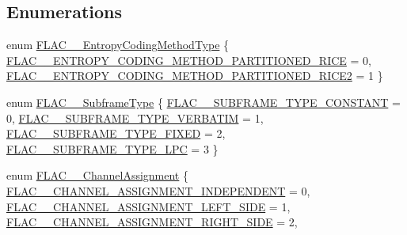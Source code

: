 \subsection*{Enumerations}
\begin{DoxyCompactItemize}
\item 
enum \mbox{\hyperlink{group__flac__format_ga951733d2ea01943514290012cd622d3a}{F\+L\+A\+C\+\_\+\+\_\+\+Entropy\+Coding\+Method\+Type}} \{ \mbox{\hyperlink{group__flac__format_gga951733d2ea01943514290012cd622d3aa5253f8b8edc61220739f229a299775dd}{F\+L\+A\+C\+\_\+\+\_\+\+E\+N\+T\+R\+O\+P\+Y\+\_\+\+C\+O\+D\+I\+N\+G\+\_\+\+M\+E\+T\+H\+O\+D\+\_\+\+P\+A\+R\+T\+I\+T\+I\+O\+N\+E\+D\+\_\+\+R\+I\+CE}} = 0, 
\mbox{\hyperlink{group__flac__format_gga951733d2ea01943514290012cd622d3aa202960a608ee91f9f11c2575b9ecc5aa}{F\+L\+A\+C\+\_\+\+\_\+\+E\+N\+T\+R\+O\+P\+Y\+\_\+\+C\+O\+D\+I\+N\+G\+\_\+\+M\+E\+T\+H\+O\+D\+\_\+\+P\+A\+R\+T\+I\+T\+I\+O\+N\+E\+D\+\_\+\+R\+I\+C\+E2}} = 1
 \}
\item 
enum \mbox{\hyperlink{group__flac__format_ga1f431eaf213e74d7747589932d263348}{F\+L\+A\+C\+\_\+\+\_\+\+Subframe\+Type}} \{ \mbox{\hyperlink{group__flac__format_gga1f431eaf213e74d7747589932d263348a9bf56d836aeffb11d614e29ea1cdf2a9}{F\+L\+A\+C\+\_\+\+\_\+\+S\+U\+B\+F\+R\+A\+M\+E\+\_\+\+T\+Y\+P\+E\+\_\+\+C\+O\+N\+S\+T\+A\+NT}} = 0, 
\mbox{\hyperlink{group__flac__format_gga1f431eaf213e74d7747589932d263348a8520596ef07d6c8577f07025f137657b}{F\+L\+A\+C\+\_\+\+\_\+\+S\+U\+B\+F\+R\+A\+M\+E\+\_\+\+T\+Y\+P\+E\+\_\+\+V\+E\+R\+B\+A\+T\+IM}} = 1, 
\mbox{\hyperlink{group__flac__format_gga1f431eaf213e74d7747589932d263348a6b3cce73039a513f9afefdc8e4f664a5}{F\+L\+A\+C\+\_\+\+\_\+\+S\+U\+B\+F\+R\+A\+M\+E\+\_\+\+T\+Y\+P\+E\+\_\+\+F\+I\+X\+ED}} = 2, 
\mbox{\hyperlink{group__flac__format_gga1f431eaf213e74d7747589932d263348a31437462c3e4c3a5a214a91eff8cc3af}{F\+L\+A\+C\+\_\+\+\_\+\+S\+U\+B\+F\+R\+A\+M\+E\+\_\+\+T\+Y\+P\+E\+\_\+\+L\+PC}} = 3
 \}
\item 
enum \mbox{\hyperlink{group__flac__format_ga79855f8525672e37f299bbe02952ef9c}{F\+L\+A\+C\+\_\+\+\_\+\+Channel\+Assignment}} \{ \mbox{\hyperlink{group__flac__format_gga79855f8525672e37f299bbe02952ef9ca3c554e4c8512c2de31dfd3305f8b31b3}{F\+L\+A\+C\+\_\+\+\_\+\+C\+H\+A\+N\+N\+E\+L\+\_\+\+A\+S\+S\+I\+G\+N\+M\+E\+N\+T\+\_\+\+I\+N\+D\+E\+P\+E\+N\+D\+E\+NT}} = 0, 
\mbox{\hyperlink{group__flac__format_gga79855f8525672e37f299bbe02952ef9ca28d41295b20593561dc9934cc977d5cb}{F\+L\+A\+C\+\_\+\+\_\+\+C\+H\+A\+N\+N\+E\+L\+\_\+\+A\+S\+S\+I\+G\+N\+M\+E\+N\+T\+\_\+\+L\+E\+F\+T\+\_\+\+S\+I\+DE}} = 1, 
\mbox{\hyperlink{group__flac__format_gga79855f8525672e37f299bbe02952ef9cad155b61582140b2b90362005f1a93e2e}{F\+L\+A\+C\+\_\+\+\_\+\+C\+H\+A\+N\+N\+E\+L\+\_\+\+A\+S\+S\+I\+G\+N\+M\+E\+N\+T\+\_\+\+R\+I\+G\+H\+T\+\_\+\+S\+I\+DE}} = 2, 

\end{DoxyCompactItemize}
